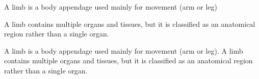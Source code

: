 \documentclass[a4paper]{article}
\title{}
\date{}
\begin{document}
    \maketitle
    A limb is a body appendage used mainly for movement (arm or leg)
    
    A limb contains multiple organs and tissues, but it is classified as an anatomical region rather than a single organ.
    
    A limb is a body appendage used mainly for movement (arm or leg).
    A limb contains multiple organs and tissues, but it is classified as an anatomical region rather than a single organ.
\end{document}
